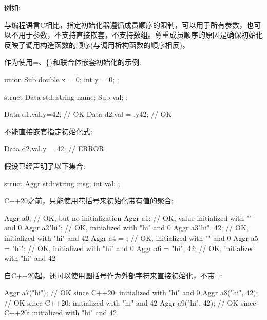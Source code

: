 例如:


与编程语言C相比，指定初始化器遵循成员顺序的限制，可以用于所有参数，也可以不用于参数，不支持直接嵌套，不支持数组。尊重成员顺序的原因是确保初始化反映了调用构造函数的顺序(与调用析构函数的顺序相反)。

作为使用=、\{\}和联合体嵌套初始化的示例:

\begin{cpp}
union Sub {
	double x = 0;
	int y = 0;
};

struct Data {
	std::string name;
	Sub val;
};

Data d1{.val{.y=42}}; // OK
Data d2{.val = {.y{42}}}; // OK
\end{cpp}

不能直接嵌套指定初始化式:

\begin{cpp}
Data d2{.val.y = 42}; // ERROR
\end{cpp}



假设已经声明了以下集合:

\begin{cpp}
struct Aggr {
	std::string msg;
	int val;
};
\end{cpp}

C++20之前，只能使用花括号来初始化带有值的聚合:

\begin{cpp}
Aggr a0; // OK, but no initialization
Aggr a1{}; // OK, value initialized with "" and 0
Aggr a2{"hi"}; // OK, initialized with "hi" and 0
Aggr a3{"hi", 42}; // OK, initialized with "hi" and 42
Aggr a4 = {}; // OK, initialized with "" and 0
Aggr a5 = {"hi"}; // OK, initialized with "hi" and 0
Aggr a6 = {"hi", 42}; // OK, initialized with "hi" and 42
\end{cpp}

自C++20起，还可以使用圆括号作为外部字符来直接初始化，不带=:

\begin{cpp}
Aggr a7("hi"); // OK since C++20: initialized with "hi" and 0
Aggr a8("hi", 42); // OK since C++20: initialized with "hi" and 42
Aggr a9({"hi", 42}); // OK since C++20: initialized with "hi" and 42
\end{cpp}


